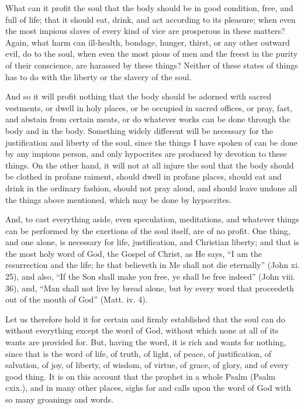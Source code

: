 What can it profit the soul that the body should be in good condition,
free, and full of life; that it should eat, drink, and act according to
its pleasure; when even the most impious slaves of every kind of vice are
prosperous in these matters? Again, what harm can ill-health, bondage,
hunger, thirst, or any other outward evil, do to the soul, when even the
most pious of men and the freest in the purity of their conscience, are
harassed by these things? Neither of these states of things has to do with
the liberty or the slavery of the soul.

And so it will profit nothing that the body should be adorned with sacred
vestments, or dwell in holy places, or be occupied in sacred offices, or
pray, fast, and abstain from certain meats, or do whatever works can be
done through the body and in the body. Something widely different will be
necessary for the justification and liberty of the soul, since the things
I have spoken of can be done by any impious person, and only hypocrites
are produced by devotion to these things. On the other hand, it will not
at all injure the soul that the body should be clothed in profane raiment,
should dwell in profane places, should eat and drink in the ordinary
fashion, should not pray aloud, and should leave undone all the things
above mentioned, which may be done by hypocrites.

And, to cast everything aside, even speculation, meditations, and whatever
things can be performed by the exertions of the soul itself, are of no
profit. One thing, and one alone, is necessary for life, justification,
and Christian liberty; and that is the most holy word of God, the Gospel
of Christ, as He says, ``I am the resurrection and the life; he that
believeth in Me shall not die eternally'' (John xi. 25), and also, ``If the
Son shall make you free, ye shall be free indeed'' (John viii. 36), and,
``Man shall not live by bread alone, but by every word that proceedeth out
of the mouth of God'' (Matt. iv. 4).

Let us therefore hold it for certain and firmly established that the soul
can do without everything except the word of God, without which none at
all of its wants are provided for. But, having the word, it is rich and
wants for nothing, since that is the word of life, of truth, of light, of
peace, of justification, of salvation, of joy, of liberty, of wisdom, of
virtue, of grace, of glory, and of every good thing. It is on this account
that the prophet in a whole Psalm (Psalm cxix.), and in many other places,
sighs for and calls upon the word of God with so many groanings and words.

